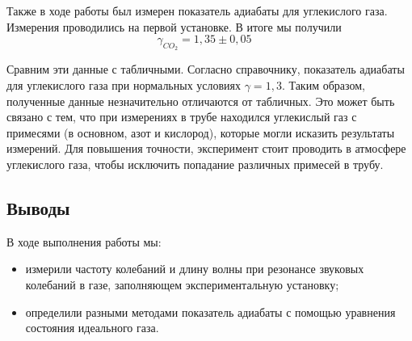 \documentclass[a4paper, 12pt]{article}
\begin{document}
Также в ходе работы был измерен показатель адиабаты для углекислого газа. Измерения проводились на первой установке. В итоге мы получили \[ \boxed{\gamma_{CO_2} = 1,35\pm 0,05}\quad\]

Сравним эти данные с табличными. Согласно справочнику, показатель адиабаты для углекислого газа при нормальных условиях \underline{$ \gamma = 1,3 $}. Таким образом, полученные данные незначительно отличаются от табличных. Это может быть связано с тем, что при измерениях в трубе находился углекислый газ с примесями (в основном, азот и кислород), которые могли исказить результаты измерений. Для повышения точности, эксперимент стоит проводить в атмосфере углекислого газа, чтобы исключить попадание различных примесей в трубу.

\begin{center}
    \section*{Выводы}
\end{center}

В ходе выполнения работы мы:

\begin{itemize}
	\item измерили частоту колебаний и длину волны при резонансе звуковых колебаний в газе, заполняющем экспериментальную установку;
	\item определили разными методами показатель адиабаты с помощью уравнения состояния идеального газа.
\end{itemize}
\end{document}
